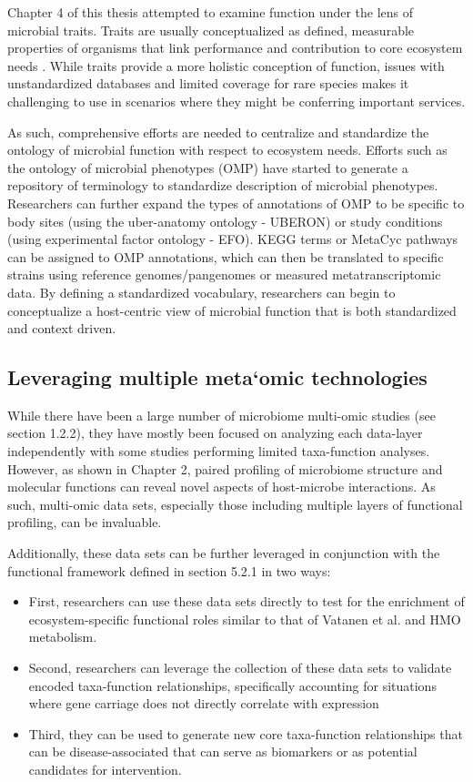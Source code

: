 Chapter 4 of this thesis attempted to examine function under the lens of microbial traits. Traits are usually conceptualized as defined, measurable properties of organisms that link performance and contribution to core ecosystem needs \cite{krause2014traitbased}. While traits provide a more holistic conception of function, issues with unstandardized databases \cite{madin2020synthesis} and limited coverage for rare species makes it challenging to use in scenarios where they might be conferring important services.  

As such, comprehensive efforts are needed to centralize and standardize the ontology of microbial function with respect to ecosystem needs. Efforts such as the ontology of microbial phenotypes (OMP) \cite{chibucos2014ontology} have started to generate a repository of terminology to standardize description of microbial phenotypes. Researchers can further expand the types of annotations of OMP to be specific to body sites (using the uber-anatomy ontology - UBERON) or study conditions (using experimental factor ontology - EFO). KEGG terms or MetaCyc pathways can be assigned to OMP annotations, which can then be translated to specific strains using reference genomes/pangenomes or measured metatranscriptomic data. By defining a standardized vocabulary, researchers can begin to conceptualize a host-centric view of microbial function that is both standardized and context driven. 

\subsection{Leveraging multiple meta`omic technologies}

While there have been a large number of microbiome multi-omic studies (see section 1.2.2), they have mostly been focused on analyzing each data-layer independently with some studies performing limited taxa-function analyses. However, as shown in Chapter 2, paired profiling of microbiome structure and molecular functions can reveal novel aspects of host-microbe interactions. As such, multi-omic data sets, especially those including multiple layers of functional profiling, can be invaluable. 

Additionally, these data sets can be further leveraged in conjunction with the functional framework defined in section 5.2.1 in two ways: 

\begin{itemize}
    \item First, researchers can use these data sets directly to test for the enrichment of ecosystem-specific functional roles similar to that of Vatanen et al. \cite{vatanen2018human} and HMO metabolism. 
    \item Second, researchers can leverage the collection of these data sets to validate encoded taxa-function relationships, specifically accounting for situations where gene carriage does not directly correlate with expression \cite{franzosa2014relating}
    \item Third, they can be used to generate new core taxa-function relationships that can be disease-associated that can serve as biomarkers or as potential candidates for intervention. 
\end{itemize}


